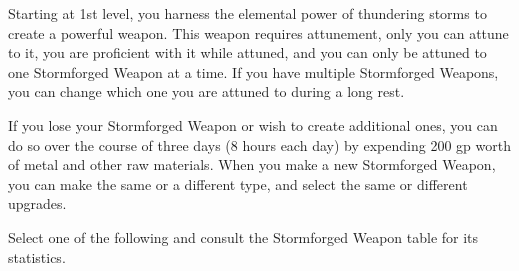 \documentclass[11pt,twoside,openany]{book}  %
\begin{document}
Starting at 1st level, you harness the elemental power of thundering storms to create a powerful weapon. This weapon requires attunement, only you can attune to it, you are proficient with it while attuned, and you can only be attuned to one Stormforged Weapon at a time. If you have multiple Stormforged Weapons, you can change which one you are attuned to during a long rest.

If you lose your Stormforged Weapon or wish to create additional ones, you can do so over the course of three days (8 hours each day) by expending 200 gp worth of metal and other raw materials. When you make a new Stormforged Weapon, you can make the same or a different type, and select the same or different upgrades.

Select one of the following and consult the Stormforged Weapon table for its statistics.

\begin{center}
\end{center}
\end{document}
